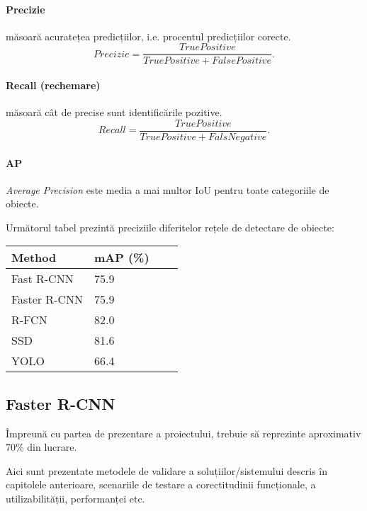 \paragraph{Precizie} măsoară acuratețea predicțiilor, i.e. procentul predicțiilor corecte.
\begin{equation}
Precizie = \frac{TruePositive}{TruePositive + FalsePositive}.
\end{equation}

\paragraph{Recall (rechemare)} măsoară cât de precise sunt identificările pozitive.
\begin{equation}
Recall = \frac{TruePositive}{TruePositive + FalsNegative}.
\end{equation}

\paragraph{AP} \textit{Average Precision} este media a mai multor IoU pentru toate categoriile de obiecte.

Următorul tabel prezintă preciziile diferitelor rețele de detectare de obiecte:

\begin{center}
    \begin{tabular}{| l | l | l | l |}
    \hline
    Method & mAP (\%) \\ \hline
    Fast R-CNN & 75.9 \\ \hline
    Faster R-CNN & 75.9 \\ \hline
    R-FCN & 82.0  \\ \hline
    SSD & 81.6 \\  \hline
    YOLO & 66.4 \\  \hline
    \end{tabular}
\end{center}



\subsection{Faster R-CNN}






Împreună cu partea de prezentare a proiectului, trebuie să reprezinte aproximativ 70\% din lucrare. 

Aici sunt prezentate metodele de validare a soluțiilor/sistemului descris în capitolele anterioare, scenariile de testare a corectitudinii funcționale, a utilizabilității, performanței etc.   

